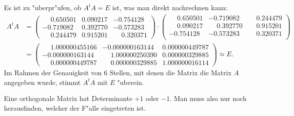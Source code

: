 \begin{loesung}
\begin{teilaufgaben}
\item Es ist zu "uberpr"ufen, ob $A^tA=E$ ist, was man direkt nachrechnen kann:
\begin{align*}
A^t A&=
\begin{pmatrix}
\phantom{-}0.650501&0.090217&          -0.754128\\
  -0.719082&0.392770&          -0.573283\\
\phantom{-}0.244479&0.915201&\phantom{-}0.320371
\end{pmatrix}
\cdot
\begin{pmatrix}
\phantom{-}0.650501&           -0.719082& \phantom{-}0.244479\\
\phantom{-}0.090217& \phantom{-}0.392770& \phantom{-}0.915201\\
  -0.754128&           -0.573283& \phantom{-}0.320371\\
\end{pmatrix}
\\
&=
\begin{pmatrix}
\phantom{-}1.000000455166&          -0.000000163144&0.000000449787\\
  -0.000000163144&\phantom{-}1.000000250390&0.000000329885\\
\phantom{-}0.000000449787&\phantom{-}0.000000329885&1.000000016114
\end{pmatrix}
\simeq E.
\end{align*}
Im Rahmen der Genauigkeit von 6 Stellen, mit denen die Matrix die
Matrix $A$ angegeben wurde, stimmt $A^tA$ mit $E$ "uberein.
\item Eine orthogonale Matrix hat Determinante $+1$ oder $-1$. Man muss
also nur noch herausfinden, welcher der F"alle eingetreten ist.


\end{teilaufgaben}
\end{loesung}
